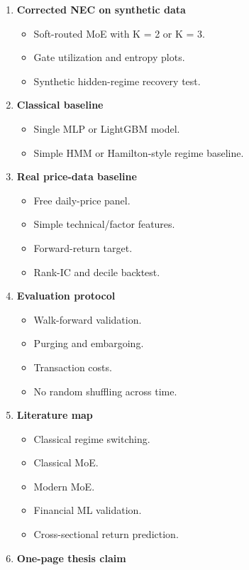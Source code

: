 \begin{enumerate}
\def\labelenumi{\arabic{enumi}.}
\tightlist
\item
  \textbf{Corrected NEC on synthetic data}

  \begin{itemize}
  \tightlist
  \item
    Soft-routed MoE with K = 2 or K = 3.
  \item
    Gate utilization and entropy plots.
  \item
    Synthetic hidden-regime recovery test.
  \end{itemize}
\item
  \textbf{Classical baseline}

  \begin{itemize}
  \tightlist
  \item
    Single MLP or LightGBM model.
  \item
    Simple HMM or Hamilton-style regime baseline.
  \end{itemize}
\item
  \textbf{Real price-data baseline}

  \begin{itemize}
  \tightlist
  \item
    Free daily-price panel.
  \item
    Simple technical/factor features.
  \item
    Forward-return target.
  \item
    Rank-IC and decile backtest.
  \end{itemize}
\item
  \textbf{Evaluation protocol}

  \begin{itemize}
  \tightlist
  \item
    Walk-forward validation.
  \item
    Purging and embargoing.
  \item
    Transaction costs.
  \item
    No random shuffling across time.
  \end{itemize}
\item
  \textbf{Literature map}

  \begin{itemize}
  \tightlist
  \item
    Classical regime switching.
  \item
    Classical MoE.
  \item
    Modern MoE.
  \item
    Financial ML validation.
  \item
    Cross-sectional return prediction.
  \end{itemize}
\item
  \textbf{One-page thesis claim}


\end{enumerate}
